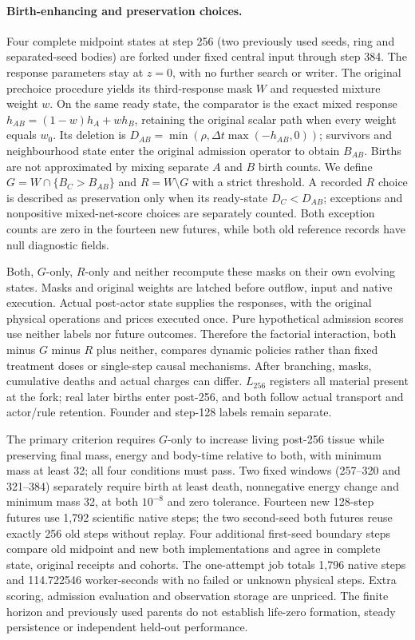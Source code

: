 \paragraph{Birth-enhancing and preservation choices.}
Four complete midpoint states at step 256 (two previously used seeds, ring and separated-seed bodies) are forked under fixed central input through step 384. The response parameters stay at $z=0$, with no further search or writer. The original prechoice procedure yields its third-response mask $W$ and requested mixture weight $w$. On the same ready state, the comparator is the exact mixed response $h_{AB}=(1-w)h_A+wh_B$, retaining the original scalar path when every weight equals $w_0$. Its deletion is $D_{AB}=\min(\rho,\Delta t\max(-h_{AB},0))$; survivors and neighbourhood state enter the original admission operator to obtain $B_{AB}$. Births are not approximated by mixing separate $A$ and $B$ birth counts. We define $G=W\cap\{B_C>B_{AB}\}$ and $R=W\setminus G$ with a strict threshold. A recorded $R$ choice is described as preservation only when its ready-state $D_C<D_{AB}$; exceptions and nonpositive mixed-net-score choices are separately counted. Both exception counts are zero in the fourteen new futures, while both old reference records have null diagnostic fields.

Both, $G$-only, $R$-only and neither recompute these masks on their own evolving states. Masks and original weights are latched before outflow, input and native execution. Actual post-actor state supplies the responses, with the original physical operations and prices executed once. Pure hypothetical admission scores use neither labels nor future outcomes. Therefore the factorial interaction, both minus $G$ minus $R$ plus neither, compares dynamic policies rather than fixed treatment doses or single-step causal mechanisms. After branching, masks, cumulative deaths and actual charges can differ. $L_{256}$ registers all material present at the fork; real later births enter post-256, and both follow actual transport and actor/rule retention. Founder and step-128 labels remain separate.

The primary criterion requires $G$-only to increase living post-256 tissue while preserving final mass, energy and body-time relative to both, with minimum mass at least 32; all four conditions must pass. Two fixed windows (257--320 and 321--384) separately require birth at least death, nonnegative energy change and minimum mass 32, at both $10^{-8}$ and zero tolerance. Fourteen new 128-step futures use 1,792 scientific native steps; the two second-seed both futures reuse exactly 256 old steps without replay. Four additional first-seed boundary steps compare old midpoint and new both implementations and agree in complete state, original receipts and cohorts. The one-attempt job totals 1,796 native steps and 114.722546 worker-seconds with no failed or unknown physical steps. Extra scoring, admission evaluation and observation storage are unpriced. The finite horizon and previously used parents do not establish life-zero formation, steady persistence or independent held-out performance.

